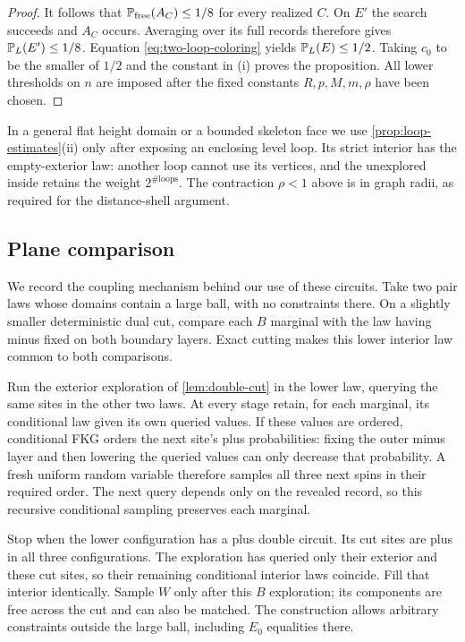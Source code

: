 \begin{proof}
It follows that $\mathbb P_{\rm free}(A_C)\le1/8$ for every realized $C$.
On $E'$ the search succeeds and $A_C$ occurs.  Averaging over its full
records therefore gives $\mathbb P_L(E')\le1/8$.  Equation
\eqref{eq:two-loop-coloring} yields $\mathbb P_L(E)\le1/2$.
Taking $c_0$ to be the smaller of $1/2$ and the constant in (i) proves
the proposition.  All lower thresholds on $n$ are imposed after the
fixed constants $R,p,M,m,\rho$ have been chosen.
\end{proof}

In a general flat height domain or a bounded skeleton face we use
\cref{prop:loop-estimates}\textup{(ii)} only after exposing an enclosing
level loop.  Its strict interior has the empty-exterior law: another
loop cannot use its vertices, and the unexplored inside retains the
weight $2^{\#\mathrm{loops}}$.  The contraction $\rho<1$ above is in
graph radii, as required for the distance-shell argument.

\subsection{Plane comparison}

We record the coupling mechanism behind our use of these circuits.  Take
two pair laws whose domains contain a large ball, with no constraints
there.  On a slightly smaller deterministic dual cut, compare each $B$
marginal with the law having minus fixed on both boundary layers.
Exact cutting makes this lower interior law common to both comparisons.

Run the exterior exploration of \cref{lem:double-cut} in the lower law,
querying the same sites in the other two laws.  At every stage retain,
for each marginal, its conditional law given its own queried values.
If these values are ordered, conditional FKG orders the next site's plus
probabilities: fixing the outer minus layer and then lowering the queried
values can only decrease that probability.  A fresh uniform random
variable therefore samples all three next spins in their required order.
The next query depends only on the revealed record, so this recursive
conditional sampling preserves each marginal.

Stop when the lower configuration has a plus double circuit.  Its cut
sites are plus in all three configurations.  The exploration has queried
only their exterior and these cut sites, so their remaining conditional
interior laws coincide.  Fill that interior identically.  Sample $W$ only
after this $B$ exploration; its components are free across the cut and can
also be matched.  The construction allows arbitrary constraints outside
the large ball, including $E_0$ equalities there.

